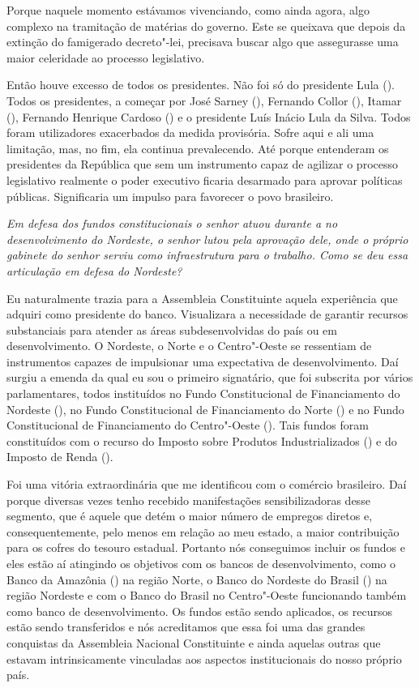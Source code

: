 Porque naquele momento estávamos vivenciando, como
ainda agora, algo complexo na tramitação de matérias do governo. Este se
queixava que depois da extinção do famigerado decreto"-lei, precisava
buscar algo que assegurasse uma maior celeridade ao processo
legislativo.

Então houve excesso de todos os presidentes. Não foi só do presidente
Lula (). Todos os presidentes, a começar por José Sarney (),
Fernando Collor (), Itamar (), Fernando Henrique Cardoso () e
o presidente Luís Inácio Lula da Silva. Todos foram utilizadores
exacerbados da medida provisória. Sofre aqui e ali uma limitação, mas,
no fim, ela continua prevalecendo. Até porque entenderam os presidentes
da República que sem um instrumento capaz de agilizar o processo
legislativo realmente o poder executivo ficaria desarmado para aprovar
políticas públicas. Significaria um impulso para favorecer o povo
brasileiro.

\medskip

\noindent\emph{Em defesa dos fundos constitucionais o senhor atuou durante a
 no desenvolvimento do Nordeste, o senhor lutou pela aprovação
dele, onde o próprio gabinete do senhor serviu como infraestrutura para
o trabalho. Como se deu essa articulação em defesa do Nordeste?}

Eu naturalmente trazia para a Assembleia
Constituinte aquela experiência que adquiri como presidente do banco.
Visualizara a necessidade de garantir recursos substanciais para atender
as áreas subdesenvolvidas do país ou em desenvolvimento. O Nordeste, o
Norte e o Centro"-Oeste se ressentiam de instrumentos capazes de
impulsionar uma expectativa de desenvolvimento. Daí surgiu a emenda da
qual eu sou o primeiro signatário, que foi subscrita por vários
parlamentares, todos instituídos no Fundo Constitucional de
Financiamento do Nordeste (), no Fundo Constitucional de
Financiamento do Norte () e no Fundo Constitucional de Financiamento
do Centro"-Oeste (). Tais fundos foram constituídos com o recurso do
Imposto sobre Produtos Industrializados () e do Imposto de Renda
().

Foi uma vitória extraordinária que me identificou com o comércio
brasileiro. Daí porque diversas vezes tenho recebido manifestações
sensibilizadoras desse segmento, que é aquele que detém o maior número
de empregos diretos e, consequentemente, pelo menos em relação ao meu
estado, a maior contribuição para os cofres do tesouro estadual.
Portanto nós conseguimos incluir os fundos e eles estão aí atingindo os
objetivos com os bancos de desenvolvimento, como o Banco da Amazônia
() na região Norte, o Banco do Nordeste do Brasil () na região
Nordeste e com o Banco do Brasil no Centro"-Oeste funcionando também como
banco de desenvolvimento. Os fundos estão sendo aplicados, os recursos
estão sendo transferidos e nós acreditamos que essa foi uma das grandes
conquistas da Assembleia Nacional Constituinte e ainda aquelas outras
que estavam intrinsicamente vinculadas aos aspectos institucionais do
nosso próprio país.

